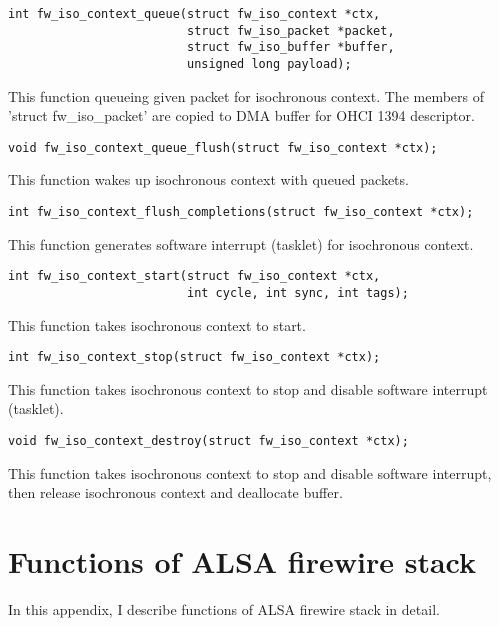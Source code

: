 \documentclass[onecolumn]{article}
\begin{document}
\begin{verbatim}
int fw_iso_context_queue(struct fw_iso_context *ctx,
                         struct fw_iso_packet *packet,
                         struct fw_iso_buffer *buffer,
                         unsigned long payload);
\end{verbatim}

This function queueing given packet for isochronous context. The members of 'struct fw\_iso\_packet' are copied to DMA buffer for OHCI 1394 descriptor.

\begin{verbatim}
void fw_iso_context_queue_flush(struct fw_iso_context *ctx);
\end{verbatim}

This function wakes up isochronous context with queued packets.

\begin{verbatim}
int fw_iso_context_flush_completions(struct fw_iso_context *ctx);
\end{verbatim}

This function generates software interrupt (tasklet) for isochronous context.

\begin{verbatim}
int fw_iso_context_start(struct fw_iso_context *ctx,
                         int cycle, int sync, int tags);
\end{verbatim}

This function takes isochronous context to start.

\begin{verbatim}
int fw_iso_context_stop(struct fw_iso_context *ctx);
\end{verbatim}

This function takes isochronous context to stop and disable software interrupt (tasklet).

\begin{verbatim}
void fw_iso_context_destroy(struct fw_iso_context *ctx);
\end{verbatim}

This function takes isochronous context to stop and disable software interrupt, then release isochronous context and deallocate buffer.

\newpage

\section{Functions of ALSA firewire stack}

In this appendix, I describe functions of ALSA firewire stack in detail.
\end{document}
